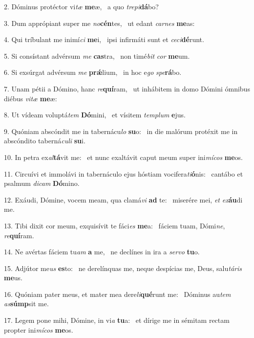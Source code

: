 2. Dóminus protéctor vi\textit{tæ} \textbf{me}æ, \ast\  a quo \textit{tre}\textit{pi}\textbf{dá}bo?\

3. Dum apprópiant super me \textit{no}\textbf{cén}tes, \ast\  ut edant \textit{car}\textit{nes} \textbf{me}as:\

4. Qui tríbulant me inimí\textit{ci} \textbf{me}i, \ast\  ipsi infirmáti sunt et \textit{ce}\textit{ci}\textbf{dé}runt.\

5. Si consístant advérsum \textit{me} \textbf{cas}tra, \ast\  non timé\textit{bit} \textit{cor} \textbf{me}um.\

6. Si exsúrgat advérsum \textit{me} \textbf{prǽ}lium, \ast\  in hoc e\textit{go} \textit{spe}\textbf{rá}bo.\

7. Unam pétii a Dómino, hanc \textit{re}\textbf{quí}ram, \ast\  ut inhábitem in domo Dómini ómnibus diébus \textit{vi}\textit{tæ} \textbf{me}æ:\

8. Ut vídeam voluptá\textit{tem} \textbf{Dó}mini, \ast\  et vísitem \textit{tem}\textit{plum} \textbf{e}jus.\

9. Quóniam abscóndit me in tabernácu\textit{lo} \textbf{su}o: \ast\  in die malórum protéxit me in abscóndito taberná\textit{cu}\textit{li} \textbf{su}i.\

10. In petra ex\textit{al}\textbf{tá}vit me: \ast\  et nunc exaltávit caput meum super ini\textit{mí}\textit{cos} \textbf{me}os.\

11. Circuívi et immolávi in tabernáculo ejus hóstiam vocifera\textit{ti}\textbf{ó}nis: \ast\  cantábo et psalmum \textit{di}\textit{cam} \textbf{Dó}mino.\

12. Exáudi, Dómine, vocem meam, qua clamá\textit{vi} \textbf{ad} te: \ast\  miserére mei, \textit{et} \textit{ex}\textbf{áu}di me.\

13. Tibi dixit cor meum, exquisívit te fáci\textit{es} \textbf{me}a: \ast\  fáciem tuam, Dómi\textit{ne}, \textit{re}\textbf{quí}ram.\

14. Ne avértas fáciem tu\textit{am} \textbf{a} me, \ast\  ne declínes in ira a \textit{ser}\textit{vo} \textbf{tu}o.\

15. Adjútor me\textit{us} \textbf{es}to: \ast\  ne derelínquas me, neque despícias me, Deus, salu\textit{tá}\textit{ris} \textbf{me}us.\

16. Quóniam pater meus, et mater mea dere\textit{li}\textbf{qué}runt me: \ast\  Dóminus au\textit{tem} \textit{as}\textbf{súmp}sit me.\

17. Legem pone mihi, Dómine, in vi\textit{a} \textbf{tu}a: \ast\  et dírige me in sémitam rectam propter ini\textit{mí}\textit{cos} \textbf{me}os.\

